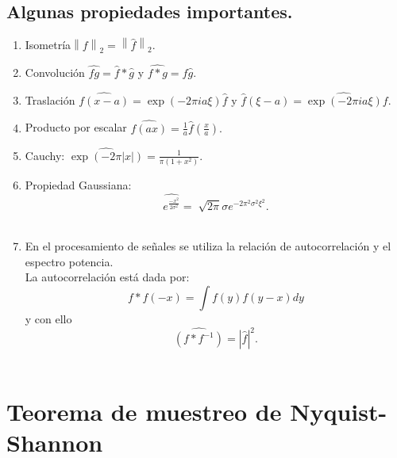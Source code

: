 \documentclass[a4paper]{article}
\begin{document}
\subsection{\sffamily Algunas propiedades importantes.}
\begin{enumerate}
\item Isometría$\left \| f \right \|_{2}=\left \| \widehat{f} \right \|_{2}.$
\item Convolución $\widehat{fg}=\widehat{f} \ast \widehat{g}$ y $\widehat{f\ast g}=\widehat{f} \widehat{g}.$
\item Traslación $\widehat{f(x-a)}=\exp(-2\pi ia\xi)\widehat{f}$ y $\widehat{f}(\xi-a)=\widehat{\exp(-2\pi ia\xi)}f.$ 
\item Producto por escalar $\widehat{f(ax)}=\frac{1}{a}\widehat{f}(\frac{x}{a}).$
\item Cauchy: $\widehat{\exp(-2\pi |x|)}=\frac{1}{\pi(1+x^{2})}.$
\item Propiedad Gaussiana:
$$
\widehat{e^{\frac{-x^{2}}{2\sigma ^{2}}}}=\sqrt[]{2\pi}\sigma e^{-2\pi^{2}\sigma^{2}\xi^{2}}.
$$
\\
\item En el procesamiento de señales se utiliza la relación de autocorrelación y el espectro potencia.\\ 
La autocorrelación está dada por:
$$
f \ast f(-x)= \int f(y)f(y-x)dy
$$ y con ello $$
\widehat{(f \ast f^{-1})}=|\widehat{f}|^{2}.
$$
\\

\end{enumerate}

\section{\sffamily Teorema de muestreo de Nyquist-Shannon}
\end{document}
